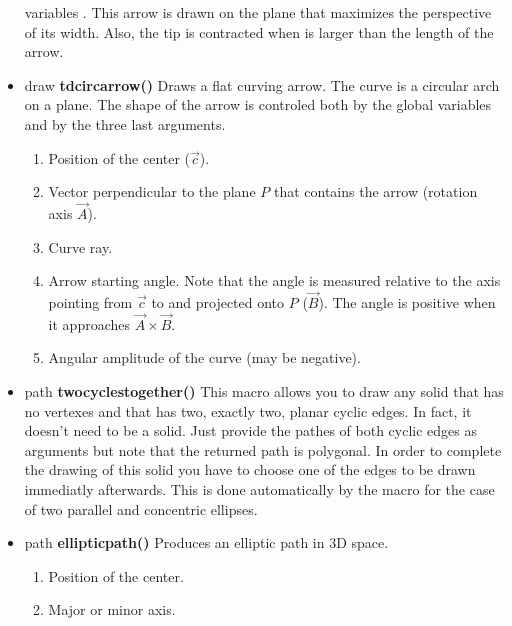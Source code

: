 \begin{itemize}
variables .
This arrow is drawn on the plane that maximizes the perspective of its
width. Also, the tip is contracted when  is larger
than the length of the arrow.
\item draw {\bfseries tdcircarrow()} Draws a flat curving arrow. The
  curve is a circular arch on a plane.
The shape of the arrow is controled both by the global
variables  and by the
three last arguments. 
\begin{enumerate}
\item {} Position of the center ($\vec{c}$).
\item {} Vector perpendicular to the plane $P$ that contains the
  arrow (rotation axis $\vec{A}$).
\item {} Curve ray.
\item {} Arrow starting angle. Note that the angle is measured
      relative to the axis pointing from $\vec{c}$ to  and
      projected onto $P$ ($\vec{B}$). The angle is positive when it
      approaches $\vec{A}\times\vec{B}$. 
\item {} Angular amplitude of the curve (may be negative).
\end{enumerate}
\item path {\bfseries twocyclestogether()} This macro
allows you to draw any solid that has no vertexes
and that has two, exactly two, planar cyclic edges.
In fact, it doesn't need to be a solid. Just
provide the pathes of both cyclic edges as arguments
but note that the returned path is polygonal.
In order to complete
the drawing of this solid you have to choose one of
the edges to be drawn immediatly afterwards. This is
done automatically by the  macro
for the case of two parallel and concentric ellipses.
\item path {\bfseries ellipticpath()} Produces an elliptic
path in 3D space.
\begin{enumerate}
\item {} Position of the center.
\item {} Major or minor axis.

\end{enumerate}
\end{itemize}
